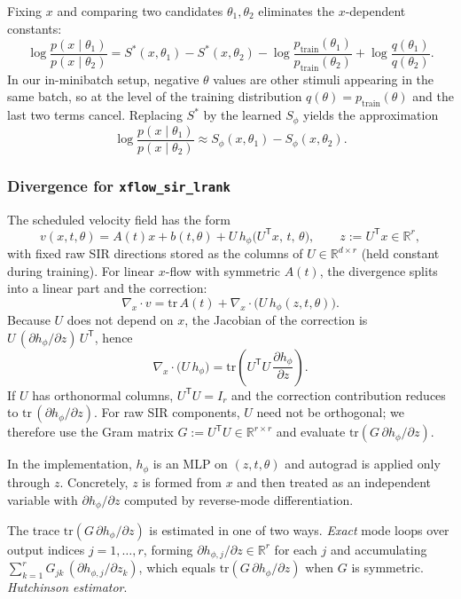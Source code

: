 Fixing $x$ and comparing two candidates $\theta_1,\theta_2$ eliminates the $x$-dependent constants:
\[
\log \frac{p(x\mid \theta_1)}{p(x\mid \theta_2)}
=
S^*(x,\theta_1)-S^*(x,\theta_2)
-
\log \frac{p_{\mathrm{train}}(\theta_1)}{p_{\mathrm{train}}(\theta_2)}
+
\log \frac{q(\theta_1)}{q(\theta_2)}.
\]
In our in-minibatch setup, negative $\theta$ values are other stimuli appearing in the same batch, so at the level of the training distribution $q(\theta)=p_{\mathrm{train}}(\theta)$ and the last two terms cancel. Replacing $S^*$ by the learned $S_\phi$ yields the approximation
\[
\log \frac{p(x\mid \theta_1)}{p(x\mid \theta_2)}
\approx
S_\phi(x,\theta_1)-S_\phi(x,\theta_2).
\]

\subsubsection{Divergence for \texttt{xflow\_sir\_lrank}}

The scheduled velocity field has the form
\[
v(x,t,\theta)=A(t)x+b(t,\theta)+U\,h_\phi\!\bigl(U^{\mathsf T}x,\,t,\,\theta\bigr),
\qquad z:=U^{\mathsf T}x\in\mathbb{R}^{r},
\]
with fixed raw SIR directions stored as the columns of $U\in\mathbb{R}^{d\times r}$ (held constant during training).
For linear $x$-flow with symmetric $A(t)$, the divergence splits into a linear part and the correction:
\[
\nabla_x\!\cdot v
=
\mathrm{tr}\,A(t)
+
\nabla_x\!\cdot\bigl(U\,h_\phi(z,t,\theta)\bigr).
\]
Because $U$ does not depend on $x$, the Jacobian of the correction is $U\,(\partial h_\phi/\partial z)\,U^{\mathsf T}$, hence
\[
\nabla_x\!\cdot\bigl(U\,h_\phi\bigr)
=
\mathrm{tr}\!\left(U^{\mathsf T}U\,\frac{\partial h_\phi}{\partial z}\right).
\]
If $U$ has orthonormal columns, $U^{\mathsf T}U=I_r$ and the correction contribution reduces to $\mathrm{tr}\,(\partial h_\phi/\partial z)$.
For raw SIR components, $U$ need not be orthogonal; we therefore use the Gram matrix $G:=U^{\mathsf T}U\in\mathbb{R}^{r\times r}$ and evaluate $\mathrm{tr}(G\,\partial h_\phi/\partial z)$.

In the implementation, $h_\phi$ is an MLP on $(z,t,\theta)$ and autograd is applied only through $z$.
Concretely, $z$ is formed from $x$ and then treated as an independent variable with $\partial h_\phi/\partial z$ computed by reverse-mode differentiation.

The trace $\mathrm{tr}(G\,\partial h_\phi/\partial z)$ is estimated in one of two ways.
\emph{Exact} mode loops over output indices $j=1,\ldots,r$, forming $\partial h_{\phi,j}/\partial z\in\mathbb{R}^{r}$ for each $j$ and accumulating $\sum_{k=1}^{r} G_{jk}\,(\partial h_{\phi,j}/\partial z_k)$, which equals $\mathrm{tr}(G\,\partial h_\phi/\partial z)$ when $G$ is symmetric.
\emph{Hutchinson estimator}.

